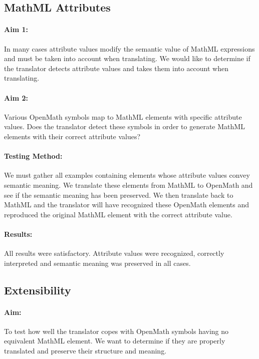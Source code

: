 \subsection{MathML Attributes}

\paragraph{Aim 1:} In many cases attribute values modify the semantic
value of MathML expressions and must be taken into account when
translating. We would like to determine if the translator detects
attribute values and takes them into account when translating.

\paragraph{Aim 2:} Various OpenMath symbols map to MathML elements with
specific attribute values. Does the translator detect these symbols in order to 
generate MathML elements with their correct attribute values?

\paragraph{Testing Method:} We must gather all examples containing
elements whose attribute values convey semantic meaning. We translate
these elements from MathML to OpenMath and see if the semantic meaning
has been preserved. We then translate back to MathML and the translator
will have recognized these OpenMath elements and reproduced the
original MathML element with the correct attribute value.

\paragraph{Results:} All results were satisfactory. Attribute values were
recognized, correctly interpreted and semantic meaning was preserved in
all cases.

\subsection{Extensibility}

\paragraph{Aim:} To test how well the translator copes with OpenMath
symbols having no equivalent MathML element. We want to determine if they
are properly translated and preserve their structure and meaning.
